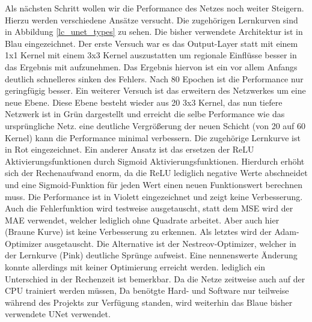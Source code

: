 Als nächsten Schritt wollen wir die Performance des Netzes noch weiter Steigern. Hierzu werden verschiedene Ansätze versucht. Die zugehörigen Lernkurven sind in Abbildung \ref{lc_unet_types} zu sehen.
Die bisher verwendete Architektur ist in Blau eingezeichnet. Der erste Versuch war es das Output-Layer statt mit einem 1x1 Kernel mit einem 3x3 Kernel auszustatten um regionale Einflüsse besser in das Ergebnis mit aufzunehmen. Das Ergebnis hiervon ist ein vor allem Anfangs deutlich schnelleres sinken des Fehlers. Nach 80 Epochen ist die Performance nur geringfügig besser. Ein weiterer Versuch ist das erweitern des Netzwerkes um eine neue Ebene. Diese Ebene besteht wieder aus 20 3x3 Kernel, das nun tiefere Netzwerk ist in Grün dargestellt und erreicht die selbe Performance wie das ursprüngliche Netz. eine deutliche Vergrößerung der neuen Schicht (von 20 auf 60 Kernel) kann die Performance minimal verbessern. Die zugehörige Lernkurve ist in Rot eingezeichnet. Ein anderer Ansatz ist das ersetzen der ReLU Aktivierungsfunktionen durch Sigmoid Aktivierungsfunktionen. Hierdurch erhöht sich der Rechenaufwand enorm, da die ReLU lediglich negative Werte abschneidet und eine Sigmoid-Funktion für jeden Wert einen neuen Funktionswert berechnen muss. Die Performance ist in Violett eingezeichnet und zeigt keine Verbesserung. Auch die Fehlerfunktion wird testweise ausgetauscht, statt dem MSE wird der MAE verwendet, welcher lediglich ohne Quadrate arbeitet. Aber auch hier (Braune Kurve) ist keine Verbesserung zu erkennen. Als letztes wird der Adam-Optimizer ausgetauscht. Die Alternative ist der Nestreov-Optimizer, welcher in der Lernkurve (Pink) deutliche Sprünge aufweist. Eine nennenswerte Änderung konnte allerdings mit keiner Optimierung erreicht werden. lediglich ein Unterschied in der Rechenzeit ist bemerkbar. Da die Netze zeitweise auch auf der CPU trainiert werden müssen, Da benötgte Hard- und Software nur teilweise während des Projekts zur Verfügung standen, wird weiterhin das Blaue bisher verwendete UNet verwendet.

